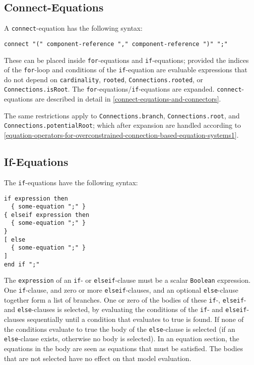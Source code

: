 \subsection{Connect-Equations}\label{connect-equations}

A \lstinline!connect!-equation has the following syntax:
\begin{lstlisting}[language=grammar]
connect "(" component-reference "," component-reference ")" ";"
\end{lstlisting}

These can be placed inside \lstinline!for!-equations and \lstinline!if!-equations; provided the indices of the \lstinline!for!-loop and conditions of the \lstinline!if!-equation are evaluable expressions that do not depend on \lstinline!cardinality!, \lstinline!rooted!, \lstinline!Connections.rooted!, or \lstinline!Connections.isRoot!.
The \lstinline!for!-equations/\lstinline!if!-equations are expanded.
\lstinline!connect!-equations are described in detail in \cref{connect-equations-and-connectors}.

The same restrictions apply to \lstinline!Connections.branch!, \lstinline!Connections.root!, and \lstinline!Connections.potentialRoot!; which after expansion are handled according to \cref{equation-operators-for-overconstrained-connection-based-equation-systems1}.

\subsection{If-Equations}\label{if-equations}

The \lstinline!if!-equations have the following syntax:
\begin{lstlisting}[language=grammar]
if expression then
  { some-equation ";" }
{ elseif expression then
  { some-equation ";" }
}
[ else
  { some-equation ";" }
]
end if ";"
\end{lstlisting}

The \lstinline!expression! of an \lstinline!if!- or \lstinline!elseif!-clause must be a scalar \lstinline!Boolean! expression.
One \lstinline!if!-clause, and zero or more \lstinline!elseif!-clauses, and an optional \lstinline!else!-clause together form a list of branches.
One or zero of the bodies of these \lstinline!if!-, \lstinline!elseif!- and \lstinline!else!-clauses is selected, by evaluating the conditions of the \lstinline!if!- and \lstinline!elseif!-clauses sequentially until a condition that evaluates to true is found.
If none of the conditions evaluate to true the body of the \lstinline!else!-clause is selected (if an \lstinline!else!-clause exists, otherwise no body is selected).
In an equation section, the equations in the body are seen as equations that must be satisfied.
The bodies that are not selected have no effect on that model evaluation.

